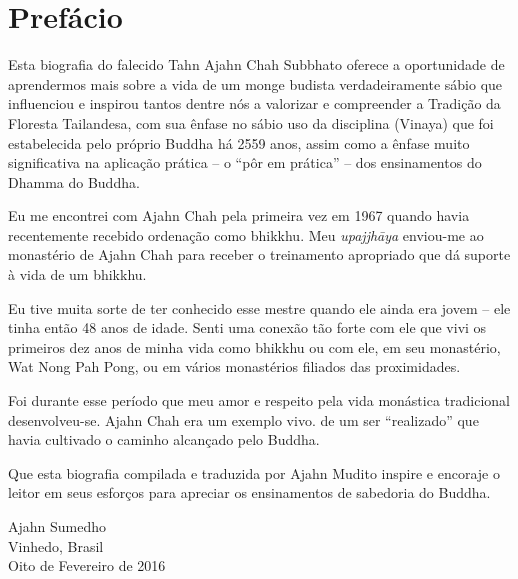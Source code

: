 \chapter{Prefácio}

\enlargethispage{\baselineskip}

Esta biografia do falecido Tahn Ajahn Chah Subbhato oferece a oportunidade de
aprendermos mais sobre a vida de um monge budista verdadeiramente sábio que
influenciou e inspirou tantos dentre nós a valorizar e compreender a Tradição da
Floresta Tailandesa, com sua ênfase no sábio uso da disciplina (Vinaya) que foi
estabelecida pelo próprio Buddha há 2559 anos, assim como a ênfase muito
significativa na aplicação prática -- o ``pôr em prática'' -- dos ensinamentos
do Dhamma do Buddha.

Eu me encontrei com Ajahn Chah pela primeira vez em 1967 quando havia
recentemente recebido ordenação como bhikkhu. Meu \emph{upajjhāya} enviou-me ao
monastério de Ajahn Chah para receber o treinamento apropriado que dá suporte à
vida de um bhikkhu.

Eu tive muita sorte de ter conhecido esse mestre quando ele ainda era jovem --
ele tinha então 48 anos de idade. Senti uma conexão tão forte com ele que vivi
os primeiros dez anos de minha vida como bhikkhu ou com ele, em seu monastério,
Wat Nong Pah Pong, ou em vários monastérios filiados das proximidades.

Foi durante esse período que meu amor e respeito pela vida monástica tradicional
desenvolveu-se. Ajahn Chah era um exemplo vivo. de um ser ``realizado'' que havia
cultivado o caminho alcançado pelo Buddha.

Que esta biografia compilada e traduzida por Ajahn Mudito inspire e encoraje o
leitor em seus esforços para apreciar os ensinamentos de sabedoria do Buddha.

\bigskip

{\raggedleft
Ajahn Sumedho\\
Vinhedo, Brasil\\
Oito de Fevereiro de 2016
\par}
